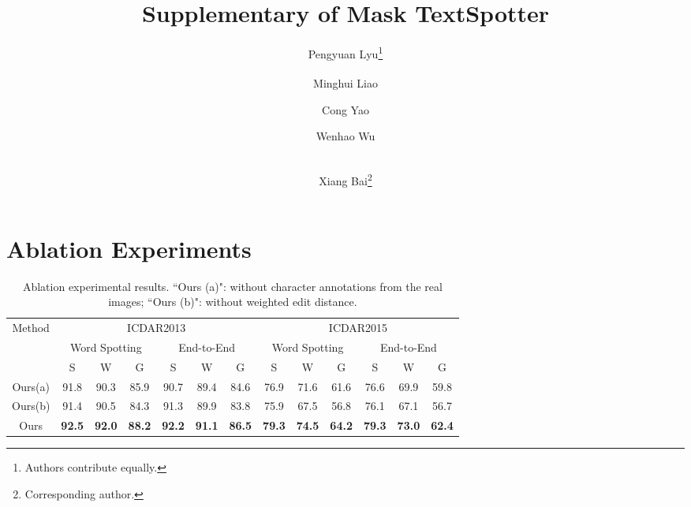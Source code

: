 \documentclass[runningheads]{llncs}
\makeatletter
\newcommand{\printfnsymbol}[1]{\textsuperscript{\@fnsymbol{#1}}}
\makeatother
\begin{document}
\title{Supplementary of Mask TextSpotter}
\author{Pengyuan Lyu\thanks{Authors contribute equally.} \and
Minghui Liao\printfnsymbol{1} \and
Cong Yao \and
Wenhao Wu \and \\
Xiang Bai\thanks{Corresponding author.}}


\maketitle
\section{Ablation Experiments}
\begin{table}
\begin{centering}
\caption{Ablation experimental results. ``Ours (a)":  without character annotations from the real images; ``Ours (b)": without weighted edit distance.}
\label{tab_discussion}
\begin{tabular}{|c|c|c|c|c|c|c|c|c|c|c|c|c|}
\hline 
\multirow{3}{*}{Method} & \multicolumn{6}{c|}{ICDAR2013} & \multicolumn{6}{c|}{ICDAR2015}\tabularnewline
\cline{2-13} 
 & \multicolumn{3}{c|}{Word Spotting} & \multicolumn{3}{c|}{End-to-End} & \multicolumn{3}{c|}{Word Spotting} & \multicolumn{3}{c|}{End-to-End}\tabularnewline
\cline{2-13} 
 & S & W & G & S & W & G & S & W & G & S & W & G\tabularnewline
\hline 
Ours(a) &91.8 &90.3 &85.9 &90.7 &89.4 &84.6 &76.9 &71.6 &61.6 &76.6 &69.9 &59.8 \tabularnewline
\hline 
Ours(b) &91.4  &90.5  &84.3  &91.3  &89.9  &83.8  &75.9  &67.5  &56.8  &76.1  &67.1  &56.7 \tabularnewline
\hline 
Ours &\textbf{92.5}  &\textbf{92.0}  &\textbf{88.2} &\textbf{92.2}  &\textbf{91.1}  &\textbf{86.5}  &\textbf{79.3}  &\textbf{74.5}  &\textbf{64.2}  &\textbf{79.3}  &\textbf{73.0}  &\textbf{62.4} \tabularnewline
\hline 
\end{tabular}
\par\end{centering}
\end{table}
\end{document}
